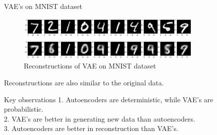 \begin{frame}{VAE's on MNIST dataset}
    \begin{figure}
        \centering
        \includegraphics[width=0.8\textwidth]{../ReportNeurips/mnistReconsrtructvae.png}
        \caption{Reconstructions of VAE on MNIST dataset}
    \end{figure}
    Reconstructions are also similar to the original data.
\end{frame}

\begin{frame}{Key observations}
    1. Autoencoders are deterministic, while VAE's are probabilistic.\\
    2. VAE's are better in generating new data than autoencoders.\\
    3. Autoencoders are better in reconstruction than VAE's.\\
\end{frame}

